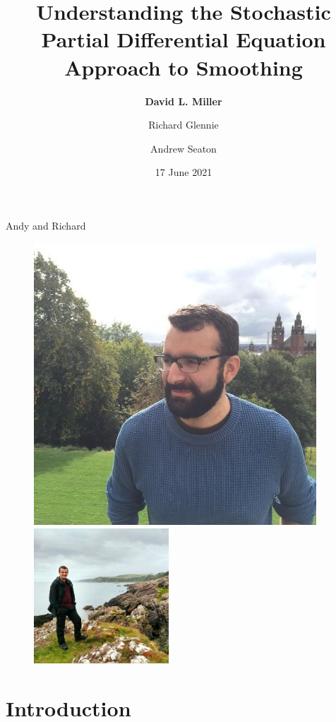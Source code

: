 \documentclass{beamer}
\title{Understanding the Stochastic Partial Differential Equation Approach to Smoothing}
\date{17 June 2021}
\author{\textbf{David L. Miller} \and Richard Glennie \and Andrew Seaton}
\institute{International Biometric Society Journal Club}
\begin{document}
\maketitle

\begin{frame}{Andy and Richard}
  \begin{figure}[h]
    \begin{center}
          \includegraphics[width=0.45
          \textwidth]{figures/andy.jpg} \includegraphics[width=0.45\textwidth]{figures/richard.jpg}
    \end{center}
  \end{figure}
\end{frame}


\section{Introduction}
\end{document}
